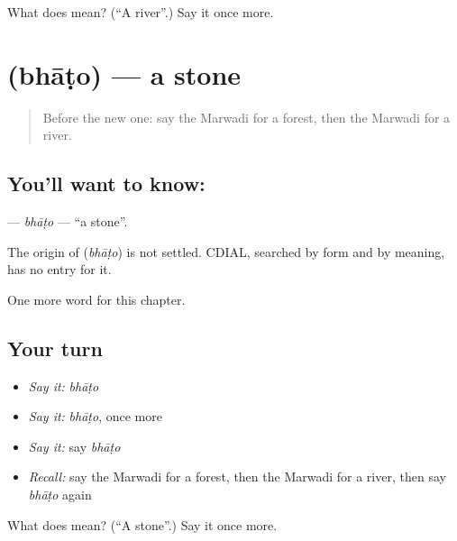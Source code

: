 \begin{tcolorbox}[breakable,colback=teal!4,colframe=teal!35!black,title={Before you move on}]
What does  mean? (\textquotedblleft{}A river\textquotedblright{}.) Say it once more.
\end{tcolorbox}
\section[\texorpdfstring{\mw{भाटो} (bhāṭo)}{भाटो (bhāṭo)}]{ (bhāṭo) — a stone}

\label{lesson:MW-C68-bhato}



\begin{quote}
Before the new one: say the Marwadi for a forest, then the Marwadi for a river.
\end{quote}

\subsection*{You'll want to know: }
\textbf{} — \emph{bhāṭo} — \textquotedblleft{}a stone\textquotedblright{}.

\begin{cousinweb}
The origin of \textbf{} (\emph{bhāṭo}) is not settled. CDIAL, searched by form and by meaning, has no entry for it.
\end{cousinweb}

\begin{grammarlens}[title={What you've built}]
One more word for this chapter.
\end{grammarlens}

\subsection*{Your turn}
\begin{itemize}
\raggedright
  \item \emph{Say it:} \emph{bhāṭo}
  \item \emph{Say it:} \emph{bhāṭo}, once more
  \item \emph{Say it:} say \emph{bhāṭo}
  \item \emph{Recall:} say the Marwadi for a forest, then the Marwadi for a river, then say \emph{bhāṭo} again
\end{itemize}

\begin{tcolorbox}[breakable,colback=teal!4,colframe=teal!35!black,title={Before you move on}]
What does  mean? (\textquotedblleft{}A stone\textquotedblright{}.) Say it once more.
\end{tcolorbox}
